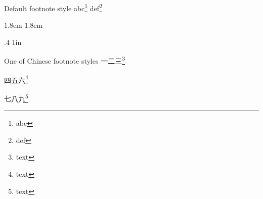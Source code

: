 \documentclass{ctexart}
\begin{document}
\makeatletter
\def\thempfootnote{{\@arabic\c@mpfootnote}}
\makeatother
\begin{example}{Default footnote style}
  abc\footnote{abc} def\footnote{def}
\end{example}

\makeatletter
\renewcommand\thefootnote{\textcircled{\@arabic\c@footnote}}

\xpatchcmd\@makefntext
  {\hb@xt@1.8em{\hss\@makefnmark}}
  {\hb@xt@1.8em{\hss\@makefnmarkNormal}\space}
  {}{\fail}

\def\@makefnmarkNormal{\lower .3ex \hbox{\normalfont\@thefnmark}}

\xpatchcmd\footnoterule
  {.4\columnwidth}
  {1in}
  {}{\fail}
\makeatother

\makeatletter
\def\thempfootnote{\textcircled{\@arabic\c@mpfootnote}}
\let\c@footnote\c@mpfootnote
\makeatother
\begin{example}{One of Chinese footnote styles}
  一二三\footnote{text}
  
  \addtocounter{footnote}{20}
  四五六\footnote{text}
  
  \addtocounter{footnote}{20}
  七八九\footnote{text}
\end{example}
\end{document}
